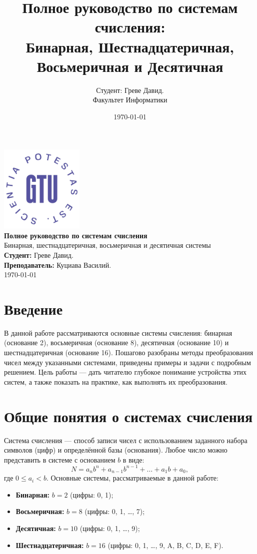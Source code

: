 \documentclass[12pt,a4paper]{article}
\title{\textbf{Полное руководство по системам счисления: \\ Бинарная, Шестнадцатеричная, Восьмеричная и Десятичная}}
\author{Студент: Греве Давид.\\Факультет Информатики}
\date{\today}
\begin{document}
\begin{titlepage}
    \centering
    \vspace*{1cm}
    \includegraphics[width=0.3\textwidth]{Georgian-Tech-logo.png}\\[1cm]
    {\LARGE \textbf{Полное руководство по системам счисления}}\\[1cm]
    {\Large Бинарная, шестнадцатеричная, восьмеричная и десятичная системы}\\[2cm]
    \textbf{Студент:} Греве Давид.\\[0.5cm]
    \textbf{Преподаватель:} Куциава Василий.\\[2cm]
    {\large \today}
    \vfill
\end{titlepage}

\tableofcontents
\newpage

\section{Введение}
В данной работе рассматриваются основные системы счисления: бинарная (основание 2), восьмеричная (основание 8), десятичная (основание 10) и шестнадцатеричная (основание 16). Пошагово разобраны методы преобразования чисел между указанными системами, приведены примеры и задачи с подробным решением. Цель работы --- дать читателю глубокое понимание устройства этих систем, а также показать на практике, как выполнять их преобразования.

\section{Общие понятия о системах счисления}
Система счисления --- способ записи чисел с использованием заданного набора символов (цифр) и определённой базы (основания). Любое число можно представить в системе с основанием \(b\) в виде:
\[
N = a_n b^n + a_{n-1} b^{n-1} + \dots + a_1 b + a_0,
\]
где \(0 \leq a_i < b\). Основные системы, рассматриваемые в данной работе:
\begin{itemize}[label=\(\bullet\)]
    \item \textbf{Бинарная:} \(b = 2\) (цифры: 0, 1);
    \item \textbf{Восьмеричная:} \(b = 8\) (цифры: 0, 1, \dots, 7);
    \item \textbf{Десятичная:} \(b = 10\) (цифры: 0, 1, \dots, 9);
    \item \textbf{Шестнадцатеричная:} \(b = 16\) (цифры: 0, 1, \dots, 9, A, B, C, D, E, F).
\end{itemize}
\end{document}
